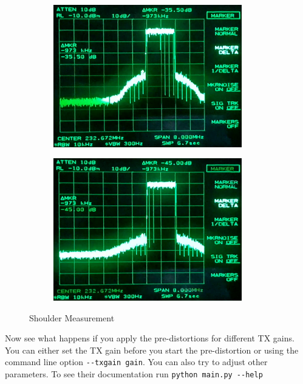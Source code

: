 \documentclass[paper=a4, fontsize=11pt]{scrartcl} %
\numberwithin{equation}{section} %
\numberwithin{figure}{section} %
\numberwithin{table}{section} %
\begin{document}
\begin{figure}
    \begin{subfigure}[c]{0.5\textwidth}
      \center
      \includegraphics[width=0.9\textwidth]{img/shoulder_measurement_before}
  \end{subfigure}%
  \begin{subfigure}[c]{0.5\textwidth}
      \center
      \includegraphics[width=0.9\textwidth]{img/shoulder_measurement_after}
  \end{subfigure}
\caption{Shoulder Measurement}
\label{fig:shoulder_measurement}
\end{figure}

Now see what happens if you apply the pre-distortions for different TX gains. You can either set the TX gain before you start the pre-distortion or using the command line option \texttt{-{}-txgain gain}. You can also try to adjust other parameters. To see their documentation run \texttt{python main.py -{}-help}
\end{document}

